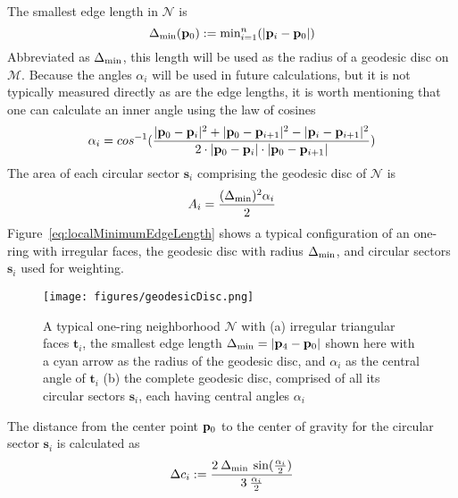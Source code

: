 The smallest edge length in $\mathcal{N}$ is 
\begin{equation}
	\Delta_\text{min}(\mathbf{p}_0) := \text{min}^n_{i=1} (|\mathbf{p}_i - \mathbf{p}_0|)
	\label{eq:localMinimumEdgeLength}
\end{equation}
%
Abbreviated as $\Delta_\text{min}$, this length will be used as the radius of a geodesic disc \todoCitation on $\mathcal{M}$.
%
Because the angles $\alpha_i$ will be used in future calculations, but it is not typically measured directly as are the edge lengths, it is worth mentioning that one can calculate an inner angle using the law of cosines
\begin{equation}
	\alpha_i = cos^{-1}(\frac{|\mathbf{p}_0 - \mathbf{p}_{i}|^2 + |\mathbf{p}_0 - \mathbf{p}_{i+1}|^2 - |\mathbf{p}_i - \mathbf{p}_{i+1}|^2}{2\cdot|\mathbf{p}_0 - \mathbf{p}_{i}|\cdot|\mathbf{p}_0 - \mathbf{p}_{i+1}|})
	\label{eq:alphaFromEdgeLengths}
\end{equation}
%
The area of each circular sector $\mathbf{s}_i$ comprising the geodesic disc of $\mathcal{N}$ is
\begin{equation}
	A_i = \frac{(\Delta_\text{min})^2\alpha_i}{2}
	\label{eq:circularSectorArea}
\end{equation}
%
%
%
Figure~\ref{eq:localMinimumEdgeLength} shows a typical configuration of an one-ring with irregular faces, the geodesic disc with radius 
$\Delta_\text{min}$, and circular sectors $\mathbf{s}_i$ used for weighting.

\begin{figure}[ht]
\ffigbox
	{\texttt{[image: figures/geodesicDisc.png]}}
	{\caption[One-ring and geodesic disc]{A typical one-ring neighborhood $\mathcal{N}$ with (a) irregular triangular faces $\mathbf{t}_i$, the smallest edge length $\Delta_\text{min} = |\mathbf{p}_4 - \mathbf{p}_0|$ shown here with a cyan arrow as the radius of the geodesic disc, and $\alpha_i$ as the central angle of $\mathbf{t}_i$ (b) the complete geodesic disc, comprised of all its circular sectors $\mathbf{s}_i$, each having central angles $\alpha_i$}\label{fig:geodesicDisc}}
\end{figure}%
%

The distance from the center point $\mathbf{p}_0$ to the center of gravity for the circular sector $\mathbf{s}_i$ is calculated as
\begin{equation}
	\Delta c_i := \frac{2\:\Delta_\text{min}\:\sin(\frac{\alpha_i}{2})}{3\:\frac{\alpha_i}{2}}
	\label{eq:circularSectorArea}
\end{equation}
%
%

